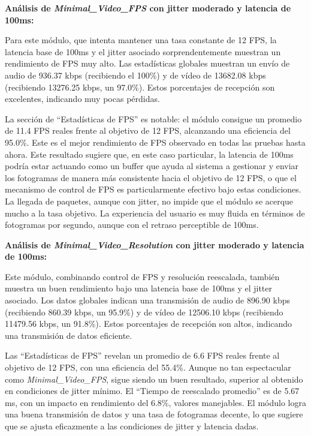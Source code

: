 \vspace{\baselineskip}

\textbf{Análisis de \textit{Minimal\_Video\_FPS} con jitter moderado y latencia de 100ms:}
\vspace{\baselineskip}

Para este módulo, que intenta mantener una tasa constante de 12 FPS, la latencia base de 100ms y el jitter asociado sorprendentemente muestran un rendimiento de FPS muy alto. Las estadísticas globales muestran un envío de audio de 936.37 kbps (recibiendo el 100\%) y de vídeo de 13682.08 kbps (recibiendo 13276.25 kbps, un 97.0\%). Estos porcentajes de recepción son excelentes, indicando muy pocas pérdidas.
\vspace{\baselineskip}

La sección de ``Estadísticas de FPS'' es notable: el módulo consigue un promedio de 11.4 FPS reales frente al objetivo de 12 FPS, alcanzando una eficiencia del 95.0\%. Este es el mejor rendimiento de FPS observado en todas las pruebas hasta ahora. Este resultado sugiere que, en este caso particular, la latencia de 100ms podría estar actuando como un buffer que ayuda al sistema a gestionar y enviar los fotogramas de manera más consistente hacia el objetivo de 12 FPS, o que el mecanismo de control de FPS es particularmente efectivo bajo estas condiciones. La llegada de paquetes, aunque con jitter, no impide que el módulo se acerque mucho a la tasa objetivo. La experiencia del usuario es muy fluida en términos de fotogramas por segundo, aunque con el retraso perceptible de 100ms.

\vspace{\baselineskip}

\textbf{Análisis de \textit{Minimal\_Video\_Resolution} con jitter moderado y latencia de 100ms:}
\vspace{\baselineskip}

Este módulo, combinando control de FPS y resolución reescalada, también muestra un buen rendimiento bajo una latencia base de 100ms y el jitter asociado. Los datos globales indican una transmisión de audio de 896.90 kbps (recibiendo 860.39 kbps, un 95.9\%) y de vídeo de 12506.10 kbps (recibiendo 11479.56 kbps, un 91.8\%). Estos porcentajes de recepción son altos, indicando una transmisión de datos eficiente.
\vspace{\baselineskip}

Las ``Estadísticas de FPS'' revelan un promedio de 6.6 FPS reales frente al objetivo de 12 FPS, con una eficiencia del 55.4\%. Aunque no tan espectacular como \textit{Minimal\_Video\_FPS}, sigue siendo un buen resultado, superior al obtenido en condiciones de jitter mínimo. El ``Tiempo de reescalado promedio'' es de 5.67 ms, con un impacto en rendimiento del 6.8\%, valores manejables. El módulo logra una buena transmisión de datos y una tasa de fotogramas decente, lo que sugiere que se ajusta eficazmente a las condiciones de jitter y latencia dadas.

